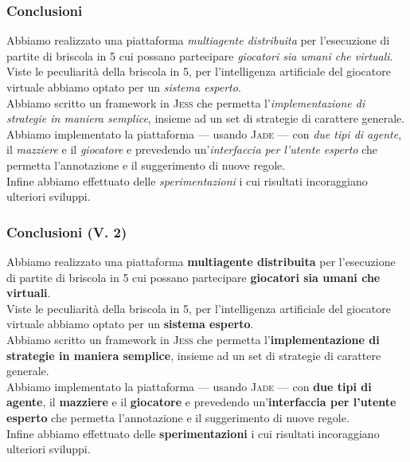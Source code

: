 \documentclass{beamer}
\begin{document}

\begin{frame}
   \frametitle{Conclusioni}
   Abbiamo realizzato una piattaforma \emph{multiagente distribuita} per l'esecuzione di partite di briscola in 5 cui possano partecipare \emph{giocatori sia umani che virtuali}.\\
   \vfill
   Viste le peculiarità della briscola in 5, per l'intelligenza artificiale del giocatore virtuale abbiamo optato per un \emph{sistema esperto}.\\
   \vfill
   Abbiamo scritto un framework in \textsc{Jess} che permetta l'\emph{implementazione di strategie in maniera semplice}, insieme ad un set di strategie di carattere generale.\\
   \vfill
   Abbiamo implementato la piattaforma --- usando \textsc{Jade} --- con \emph{due tipi di agente}, il \emph{mazziere} e il \emph{giocatore} e prevedendo un'\emph{interfaccia per l'utente esperto} che permetta l'annotazione e il suggerimento di nuove regole.\\
   \vfill
   Infine abbiamo effettuato delle \emph{sperimentazioni} i cui risultati incoraggiano ulteriori sviluppi.   
\end{frame}



\begin{frame}
   \frametitle{Conclusioni (V. 2)}
   Abbiamo realizzato una piattaforma \textbf{multiagente distribuita} per l'esecuzione di partite di briscola in 5 cui possano partecipare \textbf{giocatori sia umani che virtuali}.\\
   \vfill
   Viste le peculiarità della briscola in 5, per l'intelligenza artificiale del giocatore virtuale abbiamo optato per un \textbf{sistema esperto}.\\
   \vfill
   Abbiamo scritto un framework in \textsc{Jess} che permetta l'\textbf{implementazione di strategie in maniera semplice}, insieme ad un set di strategie di carattere generale.\\
   \vfill
   Abbiamo implementato la piattaforma --- usando \textsc{Jade} --- con \textbf{due tipi di agente}, il \textbf{mazziere} e il \textbf{giocatore} e prevedendo un'\textbf{interfaccia per l'utente esperto} che permetta l'annotazione e il suggerimento di nuove regole.\\
   \vfill
   Infine abbiamo effettuato delle \textbf{sperimentazioni} i cui risultati incoraggiano ulteriori sviluppi.   
\end{frame}
\end{document}
